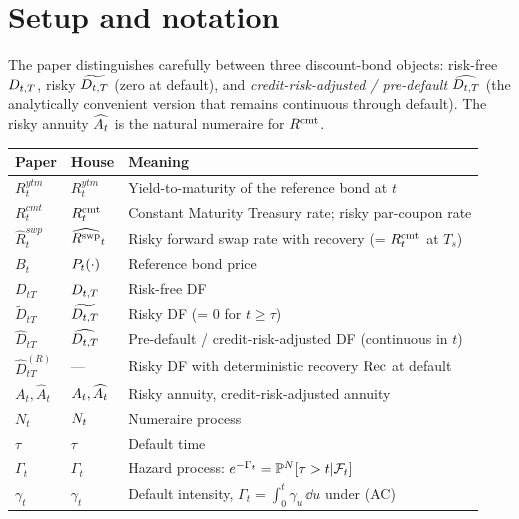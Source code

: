 \documentclass[11pt,a4paper]{article}
\begin{document}
\section{Setup and notation}

The paper distinguishes carefully between three discount-bond objects:
risk-free $D_{t,T}$, risky $\widetilde{D_{t,T}}$ (zero at
default), and \emph{credit-risk-adjusted / pre-default}
$\widehat{D_{t,T}}$ (the analytically convenient version that
remains continuous through default). The risky annuity $\widehat{A_{t}}$
is the natural numeraire for $R^{\mathrm{cmt}}$.

\begin{tabular}{@{}p{3cm}p{3.5cm}p{8.5cm}@{}}
\toprule
Paper           & House                        & Meaning \\
\midrule
$R^{ytm}_t$     & $R^{ytm}_t$                   & Yield-to-maturity of the reference bond at $t$ \\
$R^{cmt}_t$     & $R^{\mathrm{cmt}}_t$                     & Constant Maturity Treasury rate; risky par-coupon rate \\
$\widehat R^{swp}_t$ & $\widehat{R^{\mathrm{swp}}}_t$         & Risky forward swap rate with recovery (= $R^{\mathrm{cmt}}_t$ at $T_s$) \\
$B_t$           & $P_{t}(\cdot)$              & Reference bond price \\
$D_{tT}$        & $D_{t,T}$                 & Risk-free DF \\
$\widetilde D_{tT}$ & $\widetilde{D_{t,T}}$ & Risky DF (= $0$ for $t \ge \tau$) \\
$\widehat D_{tT}$ & $\widehat{D_{t,T}}$     & Pre-default / credit-risk-adjusted DF (continuous in $t$) \\
$\widehat D^{(R)}_{tT}$ & ---                   & Risky DF with deterministic recovery $\mathrm{Rec}$ at default \\
$A_t, \widehat A_t$ & $A_{t}, \widehat{A_{t}}$ & Risky annuity, credit-risk-adjusted annuity \\
$N_t$           & $N_{t}$                   & Numeraire process \\
$\tau$          & $\tau$                        & Default time \\
$\Gamma_t$      & $\Gamma_t$                    & Hazard process: $e^{-\Gamma_t} = \mathbb{P}^N[\tau>t|\mathcal{F}_{t}]$ \\
$\gamma_t$      & $\gamma_t$                    & Default intensity, $\Gamma_t = \int_0^t \gamma_u\,\dd u$ under (AC) \\

\end{tabular}
\end{document}
